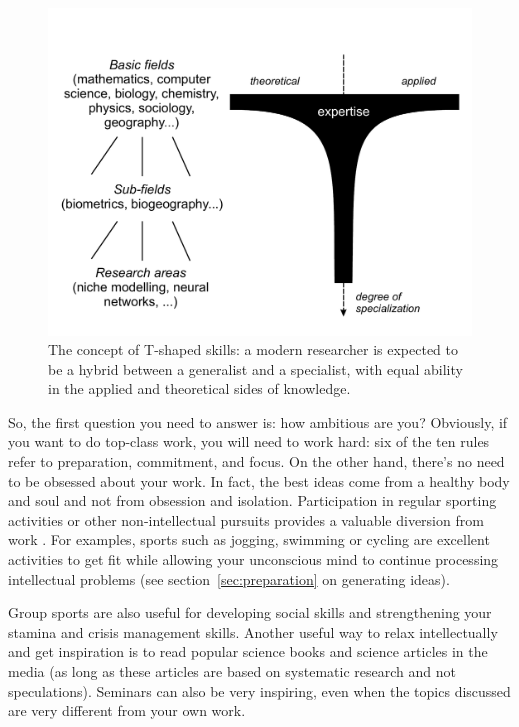 \documentclass[graybox,envcountchap,sectrefs,UStrade]{svmono}
\begin{document}
\begin{figure}[!hbt]
 \begin{center}
  \includegraphics[width=.75\textwidth]{Fig_T_shaped_skills.pdf}
 \caption{The concept of T-shaped skills: a modern researcher is expected to be a hybrid between a generalist and a specialist, with equal ability in the applied and theoretical sides of knowledge.} \label{Fig:T_shaped_skills}
 \end{center}
\end{figure}

So, the first question you need to answer is: how ambitious are you? Obviously, if you want to do top-class work, you will need to work hard: six of the ten rules refer to preparation, commitment, and focus. On the other hand, there's no need to be obsessed about your work. In fact, the best ideas come from a healthy body and soul and not from obsession and isolation. Participation in regular sporting activities or other non-intellectual pursuits provides a valuable diversion from work \citep{Creedy2008research}. For examples, sports such as jogging, swimming or cycling are excellent activities to get fit while allowing your unconscious mind to continue processing intellectual problems (see section~\ref{sec:preparation} on generating ideas).\par

Group sports are also useful for developing social skills and strengthening your stamina and crisis management skills. Another useful way to relax intellectually and get inspiration is to read popular science books and science articles in the media (as long as these articles are based on systematic research and not speculations). Seminars can also be very inspiring, even when the topics discussed are very different from your own work.\par
\end{document}
